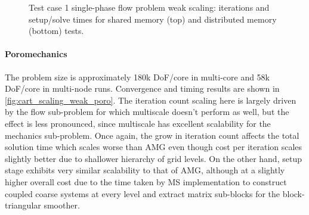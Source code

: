 \begin{figure} [htbp]
  \begin{subfigure}[t]{0.48\textwidth}
    \centering
    
  \end{subfigure}
  \hfill
   \begin{subfigure}[t]{0.48\textwidth}
    \centering
    
  \end{subfigure}
  \begin{subfigure}[t]{0.48\textwidth}
    \centering
    
  \end{subfigure}
  \hfill
  \begin{subfigure}[t]{0.48\textwidth}
    \centering
    
  \end{subfigure}
  \caption[Test case 1 single-phase flow problem weak scaling]{Test case 1 single-phase flow problem weak scaling: iterations and setup/solve times for shared memory (top) and distributed memory (bottom) tests.}
  \label{fig:cart_scaling_weak_flow}
\end{figure}

\paragraph{Poromechanics}
The problem size is approximately 180k DoF/core in multi-core and 58k DoF/core in multi-node runs.   Convergence and timing results are shown in \cref{fig:cart_scaling_weak_poro}.   The iteration count scaling here is largely driven by the flow sub-problem for which multiscale doesn't perform as well, but the effect is less pronounced, since multiscale has excellent scalability for the mechanics sub-problem.   Once again, the grow in iteration count affects the total solution time which scales worse than AMG even though cost per iteration scales slightly better due to shallower hierarchy of grid levels.   On the other hand, setup stage exhibits very similar scalability to that of AMG, although at a slightly higher overall cost due to the time taken by MS implementation to construct coupled coarse systems at every level and extract matrix sub-blocks for the block-triangular smoother.


